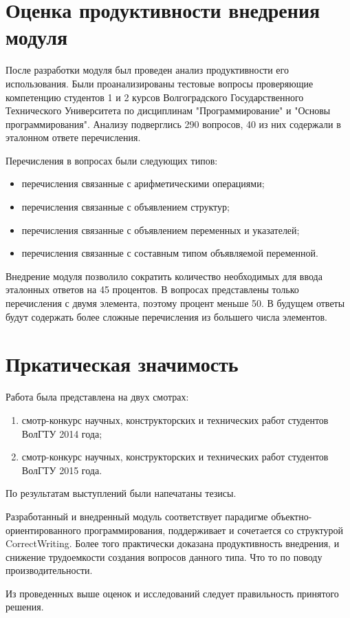 \documentclass[a4paper,english,russian]{G2-105}
\begin{document}
\section{Оценка продуктивности внедрения модуля}
\par После разработки модуля был проведен анализ продуктивности его использования. Были проанализированы тестовые вопросы проверяющие компетенцию студентов 1 и 2 курсов Волгоградского Государственного Технического Университета по дисциплинам "Программирование" и "Основы программирования". Анализу подверглись 290 вопросов, 40 из них содержали в эталонном ответе перечисления.
\par Перечисления в вопросах были следующих типов:
\begin{itemize}
    \item перечисления связанные с арифметическими операциями;
    \item перечисления связанные с объявлением структур;
    \item перечисления связанные с объявлением переменных и указателей;
    \item перечисления связанные с составным типом объявляемой переменной.
\end{itemize}
\par Внедрение модуля позволило сократить количество необходимых для ввода эталонных ответов на 45 процентов. В вопросах представлены только перечисления с двумя элемента, поэтому процент меньше 50. В будущем ответы будут содержать более сложные перечисления из большего числа элементов. 
\section{Пркатическая значимость}
\par Работа была представлена на двух смотрах:
\begin{enumerate}
    \item смотр-конкурс научных, конструкторских и технических работ студентов ВолГТУ 2014 года;
    \item смотр-конкурс научных, конструкторских и технических работ студентов ВолГТУ 2015 года.
\end{enumerate}
\par По результатам выступлений были напечатаны тезисы.
\par
\par
\par
{}
\par Разработанный и внедренный модуль соответствует парадигме объектно-ориентированного программирования, поддерживает и сочетается со структурой CorrectWriting. Более того практически доказана продуктивность внедрения, и снижение трудоемкости создания вопросов данного типа. Что то по поводу производительности.
\par Из проведенных выше оценок и исследований следует правильность принятого решения. 
\end{document}
